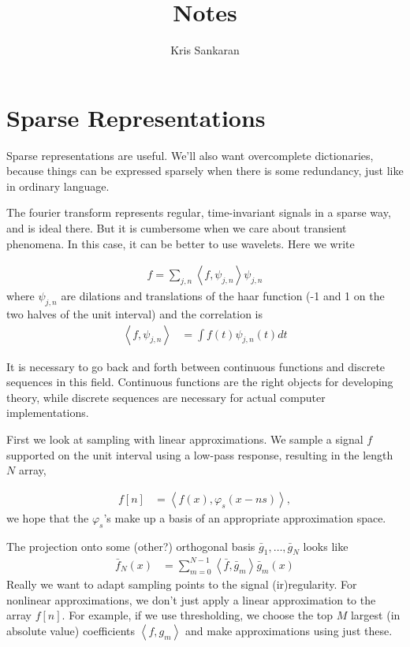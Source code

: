 \documentclass{article}
\title{Notes}
\author{Kris Sankaran}
\begin{document}
\section{Sparse Representations}
\label{sec:chapter_1}

Sparse representations are useful. We'll also want overcomplete dictionaries,
because things can be expressed sparsely when there is some redundancy, just
like in ordinary language.

The fourier transform represents regular, time-invariant signals in a sparse
way, and is ideal there. But it is cumbersome when we care about transient
phenomena. In this case, it can be better to use wavelets. Here we write

\begin{align}
  f = \sum_{j, n} \left<f, \psi_{j, n}\right> \psi_{j, n}
\end{align}
where $\psi_{j, n}$ are dilations and translations of the haar function (-1 and
1 on the two halves of the unit interval) and the correlation is
\begin{align}
\left<f, \psi_{j, n}\right> &= \int f\left(t\right) \psi_{j, n}\left(t\right) dt
\end{align}

It is necessary to go back and forth between continuous functions and discrete
sequences in this field. Continuous functions are the right objects for
developing theory, while discrete sequences are necessary for actual computer
implementations.

First we look at sampling with linear approximations. We sample a signal $f$
supported on the unit interval using a low-pass response, resulting in the
length $N$ array,

\begin{align}
f\left[n\right] &= \left<f\left(x\right), \varphi_{s}\left(x - ns\right)\right>,
\end{align}
we hope that the $\varphi_{s}$'s make up a basis of an appropriate approximation
space.

The projection onto some (other?) orthogonal basis $\bar{g}_{1}, \dots,
\bar{g}_{N}$ looks like
\begin{align}
\bar{f}_{N}\left(x\right) &= \sum_{m = 0}^{N - 1} \left<\bar{f}, \bar{g}_{m}\right>\bar{g}_{m}\left(x\right)
\end{align}
Really we want to adapt sampling points to the signal (ir)regularity. For
nonlinear approximations, we don't just apply a linear approximation to the
array $f\left[n\right]$. For example, if we use thresholding, we choose the top
$M$ largest (in absolute value) coefficients $\left<f, g_m\right>$ and make
approximations using just these.
\end{document}
